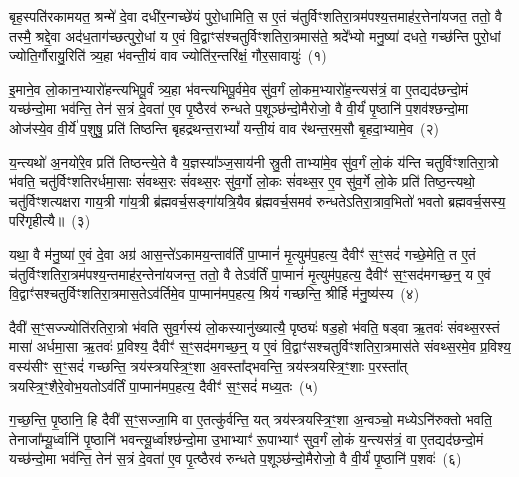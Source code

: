 \setcounter{anuvakam}{0}
बृह॒स्पति॑रकामयत॒ श्रन्मे॑ दे॒वा दधी॑र॒न्गच्छे॑यं पुरो॒धामिति॒ स ए॒तं च॑तुर्विꣳशतिरा॒त्रम॑पश्य॒त्तमाह॑र॒त्तेना॑यजत॒ ततो॒ वै तस्मै॒ श्रद्दे॒वा अद॑ध॒ताग॑च्छत्पुरो॒धां य ए॒वं वि॒द्वाꣳस॑श्चतुर्विꣳशतिरा॒त्रमास॑ते॒ श्रदे᳚भ्यो मनु॒ष्या॑ दधते॒ गच्छ॑न्ति पुरो॒धां ज्योति॒र्गौरायु॒रिति॑ त्र्य॒हा भ॑वन्ती॒यं वाव ज्योति॑र॒न्तरि॑क्षं॒ गौर॒सावायुः॑~(१)\ip

इ॒माने॒व लो॒कान॒भ्यारो॑हन्त्यभिपू॒र्वं त्र्य॒हा भ॑वन्त्यभिपू॒र्वमे॒व सु॑व॒र्गं लो॒कम॒भ्यारो॑ह॒न्त्यस॑त्रं॒ वा ए॒तद्यद॑छन्दो॒मं यच्छ॑न्दो॒मा भव॑न्ति॒ तेन॑ स॒त्रं दे॒वता॑ ए॒व पृ॒ष्ठैरव॑ रुन्धते प॒शूञ्छ॑न्दो॒मैरोजो॒ वै वी॒र्यं॑ पृ॒ष्ठानि॑ प॒शव॑श्छन्दो॒मा ओज॑स्ये॒व वी॒र्ये॑ प॒शुषु॒ प्रति॑ तिष्ठन्ति बृहद्रथन्त॒रा\-भ्यां᳚ यन्ती॒यं वाव र॑थन्त॒रम॒सौ बृ॒हदा॒भ्यामे॒व~(२)\ip

य॒न्त्यथो॑ अ॒नयो॑रे॒व प्रति॑ तिष्ठन्त्ये॒ते वै य॒ज्ञस्या᳚ञ्ज॒साय॑नी स्रु॒ती ताभ्या॑मे॒व सु॑व॒र्गं लो॒कं य॑न्ति चतुर्विꣳशतिरा॒त्रो भ॑वति॒ चतु॑र्विꣳशतिरर्धमा॒साः सं॑वथ्स॒रः सं॑वथ्स॒रः सु॑व॒र्गो लो॒कः सं॑वथ्स॒र ए॒व सु॑व॒र्गे लो॒के प्रति॑ तिष्ठ॒न्त्यथो॒ चतु॑र्विꣳशत्यक्षरा गाय॒त्री गा॑य॒त्री ब्र॑ह्मवर्च॒सङ्गा॑यत्रि॒यैव ब्र॑ह्मवर्च॒समव॑ रुन्धते\-ऽतिरा॒त्राव॒भितो॑ भवतो ब्रह्मवर्च॒सस्य॒ परि॑गृहीत्यै॥~(३)\ip

{\anuvakamend[{अ॒सावायु॑रा॒भ्यामे॒व पञ्च॑चत्वारिꣳशच्च}]}

यथा॒ वै म॑नु॒ष्या॑ ए॒वं दे॒वा अग्र॑ आस॒न्ते॑\-ऽकामय॒न्ताव॑र्तिं पा॒प्मानं॑ मृ॒त्युम॑प॒हत्य॒ दैवीꣳ॑ स॒ꣳ॒सदं॑ गच्छे॒मेति॒ त ए॒तं च॑तुर्विꣳशतिरा॒त्रम॑पश्य॒न्तमाह॑र॒न्तेना॑यजन्त॒ ततो॒ वै ते\-ऽव॑र्तिं पा॒प्मानं॑ मृ॒त्युम॑प॒हत्य॒ दैवीꣳ॑ स॒ꣳ॒सद॑मगच्छ॒न्॒ य ए॒वं वि॒द्वाꣳ॑सश्चतुर्विꣳशतिरा॒त्रमास॒ते\-ऽव॑र्तिमे॒व पा॒प्मान॑मप॒हत्य॒ श्रियं॑ गच्छन्ति॒ श्रीर्\mbox{}हि म॑नु॒ष्य॑स्य~(४)\ip

दैवी॑ स॒ꣳ॒सज्ज्योति॑रतिरा॒त्रो भ॑वति सुव॒र्गस्य॑ लो॒कस्यानु॑ख्यात्यै॒ पृष्ठ्यः॑ षड॒हो भ॑वति॒ षड्वा ऋ॒तवः॑ संवथ्स॒रस्तं मासा॑ अर्धमा॒सा ऋ॒तवः॑ प्र॒विश्य॒ दैवीꣳ॑ स॒ꣳ॒सद॑मगच्छ॒न्॒ य ए॒वं वि॒द्वाꣳ॑सश्चतुर्विꣳशतिरा॒त्रमास॑ते संवथ्स॒रमे॒व प्र॒विश्य॒ वस्य॑सीꣳ स॒ꣳ॒सदं॑ गच्छन्ति॒ त्रय॑स्त्रयस्त्रि॒ꣳ॒शा अ॒वस्ता᳚द्भवन्ति॒ त्रय॑स्त्रयस्त्रि॒ꣳ॒शाः प॒रस्ता᳚त् त्रयस्त्रि॒ꣳ॒शैरे॒वोभ॒यतो\-ऽव॑र्तिं पा॒प्मान॑मप॒हत्य॒ दैवीꣳ॑ स॒ꣳ॒सदं॑ मध्य॒तः~(५)\ip

ग॒च्छ॒न्ति॒ पृ॒ष्ठानि॒ हि दैवी॑ स॒ꣳ॒सज्जा॒मि वा ए॒तत्कु॑र्वन्ति॒ यत् त्रय॑स्त्रयस्त्रि॒ꣳ॒शा अ॒न्वञ्चो॒ मध्ये\-ऽनि॑रुक्तो भवति॒ तेनाजा᳚म्यू॒र्ध्वानि॑ पृ॒ष्ठानि॑ भवन्त्यू॒र्ध्वाश्छ॑न्दो॒मा उ॒भाभ्याꣳ॑ रू॒पाभ्याꣳ॑ सुव॒र्गं लो॒कं य॒न्त्यस॑त्रं॒ वा ए॒तद्यद॑छन्दो॒मं यच्छ॑न्दो॒मा भव॑न्ति॒ तेन॑ स॒त्रं दे॒वता॑ ए॒व पृ॒त्ष्ठैरव॑ रुन्धते प॒शूञ्छ॑न्दो॒मैरोजो॒ वै वी॒र्यं॑ पृ॒ष्ठानि॑ प॒शवः॑~(६)\ip

